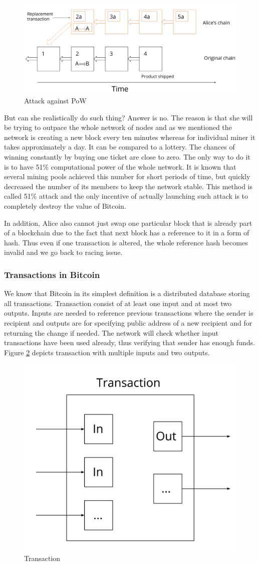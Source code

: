 \documentclass[conference,compsoc]{IEEEtran}
\begin{document}
\begin{figure}[h]
  \centering
  \includegraphics[width=.45\textwidth]{graphics/pow.png}
  \caption{Attack against PoW}
  \label{fig:fig4}
\end{figure}

But can she realistically do such thing? 
Answer is no.
The reason is that she will be trying to outpace the whole network of nodes and as we mentioned the network is creating a new block every ten minutes whereas for individual miner it takes approximately a day. 
It can be compared to a lottery. 
The chances of winning constantly by buying one ticket are close to zero. 
The only way to do it is to have 51\% computational power of the whole network.
It is known that several mining pools achieved this number for short periods of time, but quickly decreased the number of its members to keep the network stable.
This method is called 51\% attack and the only incentive of actually launching such attack is to completely destroy the value of Bitcoin. 

In addition, Alice also cannot just swap one particular block that is already part of a blockchain due to the fact that next block has a reference to it in a form of hash. 
Thus even if one transaction is altered, the whole reference hash becomes invalid and we go back to racing issue.

\subsubsection{Transactions in Bitcoin}
We know that Bitcoin in its simplest definition is a distributed database storing all transactions. 
Transaction consist of at least one input and at most two outputs.
Inputs are needed to reference previous transactions where the sender is recipient and outputs are for specifying public address of a new recipient and for returning the change if needed.
The network will check whether input transactions have been used already, thus verifying that sender has enough funds.
Figure \ref{fig:fig5} depicts transaction with multiple inputs and two outputs.

\begin{figure}[h]
  \centering
  \includegraphics[width=.45\textwidth]{graphics/tx.png}
  \caption{Transaction}
  \label{fig:fig5}
\end{figure}
\end{document}
